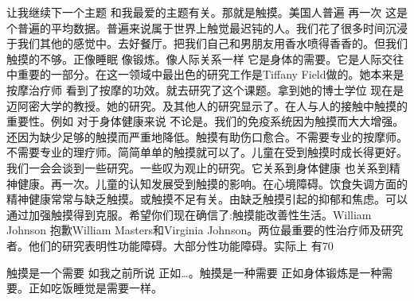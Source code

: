 让我继续下一个主题 和我最爱的主题有关。那就是触摸。美国人普遍 再一次 这是个普遍的平均数据。普遍来说属于世界上触觉最迟钝的人。我们花了很多时间沉浸于我们其他的感觉中。去好餐厅。把我们自己和男朋友用香水喷得香香的。但我们触摸的不够。正像睡眠 像锻炼。像人际关系一样 它是身体的需要。它是人际交往中重要的一部分。在这一领域中最出色的研究工作是Tiffany Field做的。她本来是按摩治疗师 看到了按摩的功效。就去研究了这个课题。拿到她的博士学位 现在是迈阿密大学的教授。她的研究。及其他人的研究显示了。在人与人的接触中触摸的重要性。例如 对于身体健康来说 不论是。我们的免疫系统因为触摸而大大增强。还因为缺少足够的触摸而严重地降低。触摸有助伤口愈合。不需要专业的按摩师。不需要专业的理疗师。简简单单的触摸就可以了。儿童在受到触摸时成长得更好。我们一会会谈到一些研究。一些叹为观止的研究。它关系到身体健康 也关系到精神健康。再一次。儿童的认知发展受到触摸的影响。在心境障碍。饮食失调方面的精神健康常常与缺乏触摸。或触摸不足有关。由缺乏触摸引起的抑郁和焦虑。可以通过加强触摸得到克服。希望你们现在确信了:触摸能改善性生活。William Johnson 抱歉William Masters和Virginia Johnson。两位最重要的性治疗师及研究者。他们的研究表明性功能障碍。大部分性功能障碍。实际上 有70%

触摸是一个需要 如我之前所说 正如…。触摸是一种需要 正如身体锻炼是一种需要。正如吃饭睡觉是需要一样。 


